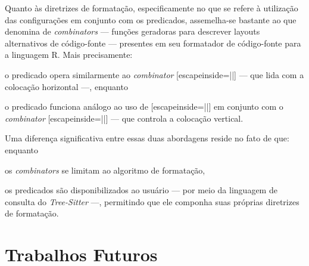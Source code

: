 \documentclass
  [11pt,a4paper,english,brazil,openright,sumario=tradicional,twoside]
  {abntex2}
\newcommand{\treesitter}{\textit{Tree-Sitter}\xspace}
\begin{document}
  Quanto às diretrizes de formatação, especificamente no que se refere à
  utilização das configurações em conjunto com os predicados, assemelha-se
  bastante ao que \textcite{yelland-2015-new} denomina de \textit{combinators}
  --- funções geradoras para descrever layouts alternativos de código-fonte ---
  presentes em seu formatador de código-fonte para a linguagem R. Mais
  precisamente:
  \begin{inparaenum}
    \item o predicado  opera similarmente ao
          \textit{combinator}
          \codesnippetinline{|$\leftrightarrow$|}[escapeinside=||] --- que lida
          com a colocação horizontal ---, enquanto
    \item o predicado  funciona análogo ao uso de
          \codesnippetinline{|$\leftrightarrow$|}[escapeinside=||] em conjunto
          com o \textit{combinator}
          \codesnippetinline{|$\updownarrow$|}[escapeinside=||] --- que
          controla a colocação vertical.
  \end{inparaenum}
  Uma diferença significativa entre essas duas abordagens reside no fato de
  que: enquanto
  \begin{inparaenum}
    \item os \textit{combinators} se limitam ao algoritmo de formatação,
    \item os predicados são disponibilizados ao usuário --- por meio da
          linguagem de consulta do \treesitter{} ---, permitindo que ele
          componha suas próprias diretrizes de formatação.
  \end{inparaenum}


  \section{Trabalhos Futuros}
\end{document}
